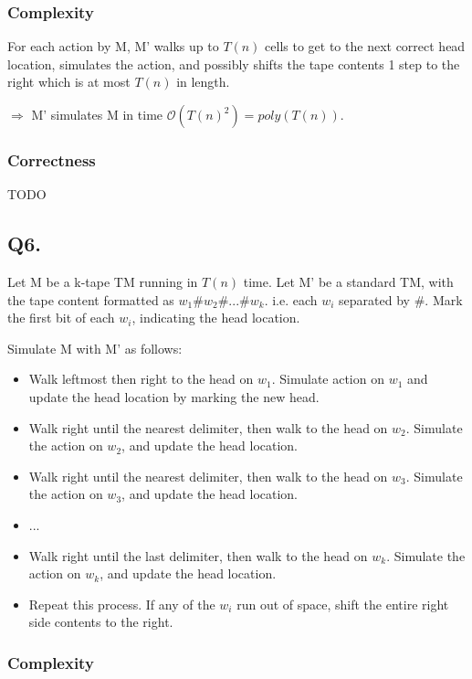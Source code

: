 \documentclass[letterpaper]{article}
\begin{document}
\subsubsection*{Complexity}

For each action by M, M' walks up to $T(n)$ cells to get to the next correct
head location, simulates the action, and possibly shifts the tape contents
1 step to the right which is at most $T(n)$ in length.

$\Rightarrow$ M' simulates M in time $\mathcal{O}(T(n)^2) = poly(T(n))$.

\subsubsection*{Correctness}

TODO

\subsection*{Q6.}

Let M be a k-tape TM running in $T(n)$ time.
Let M' be a standard TM, with the tape content formatted as
$w_1 \# w_2 \# ... \# w_k $. i.e. each $w_i$ separated by $\#$.
Mark the first bit of each $w_i$, indicating the head location.

Simulate M with M' as follows:
\begin{itemize}
      \item Walk leftmost then right to the head on $w_1$. Simulate action on $w_1$
            and update the head location by marking the new head.
      \item Walk right until the nearest delimiter, then walk to the head on $w_2$.
            Simulate the action on $w_2$, and update the head location.
      \item Walk right until the nearest delimiter, then walk to the head on $w_3$.
            Simulate the action on $w_3$, and update the head location.
      \item ...
      \item Walk right until the last delimiter, then walk to the head on $w_k$.
            Simulate the action on $w_k$, and update the head location.
      \item Repeat this process. If any of the $w_i$ run out of space, shift the
            entire right side contents to the right.
\end{itemize}

\subsubsection*{Complexity}
\end{document}
